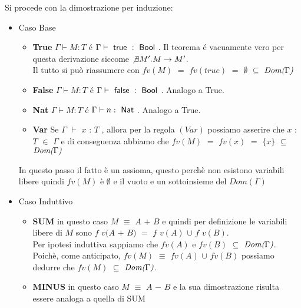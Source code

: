 Si procede con la dimostrazione per induzione:

\begin{itemize}


\item Caso Base 
		\begin{itemize}[label=$\star$]

		\item \textbf{True}  $\Gamma \vdash{} M : T$ \'e $\Gamma \vdash{} \true{} : \Bool$.
  		Il teorema \'e vacuamente vero per questa derivazione siccome $\not \exists{M'}. M \to{} M'$.\\
  		Il tutto si pu\`o riassumere con $fv(M)$ $=$ $fv(true)$ $=$ $\emptyset$ $\subseteq$ $\emph{Dom(}\Gamma\emph{)}$

  
 		\item \textbf{False} $\Gamma \vdash{} M : T$ \'e $\Gamma \vdash{} \false{} : \Bool$. Analogo a True.

		\item \textbf{Nat} $\Gamma \vdash{} M : T$ \'e $\Gamma \vdash{} n : \Nat$. Analogo a True.

		\item \textbf{Var}  Se $\Gamma$ $\vdash$ $x$ : $T$ , allora per la regola $(Var)$ possiamo asserire che $x$ : $T$ $\in$ $\Gamma$ e di conseguenza abbiamo che  $fv(M)$ $=$ $fv(x)$ $=$ $\{x\}$ $\subseteq$ $\emph{Dom(}\Gamma\emph{)}$

  
		\end{itemize}
		In questo passo il fatto \`e un assioma, questo perch\`e non esistono variabili libere quindi $fv(M)$ \`e $\emptyset$ e il vuoto e un sottoinsieme del $Dom(\Gamma)$

\item Caso Induttivo
		
		\begin{itemize}[label=$\star$]

		\item \textbf{SUM}  in questo caso $M$ $\equiv$ $A$ $+$ $B$ e quindi per definizione le variabili libere di $M$ sono $f$ $v(A$ $+$ $B)$ $=$ $f$ $v(A)$ $\cup$ $f$ $v(B)$.\\ Per ipotesi induttiva sappiamo che $fv(A)$ e $fv(B)$ $\subseteq$ $\emph{Dom(}\Gamma\emph{)}$.\\Poich\`e, come anticipato, $fv(M)$ $\equiv$ $fv(A)$ $\cup$ $fv(B)$ possiamo dedurre che $fv(M)$ $\subseteq$ $\emph{Dom(}\Gamma\emph{)}$.
  		
  
 		\item \textbf{MINUS} in questo caso $M$ $\equiv$ $A$ $-$ $B$ e la sua dimostrazione risulta essere analoga a quella di SUM


\end{itemize}
\end{itemize}
